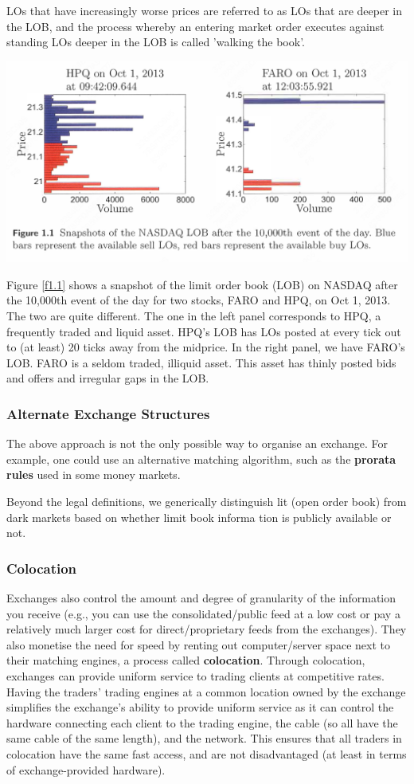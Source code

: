 \documentclass[11pt]{article}
\begin{document}
LOs that have increasingly worse prices are referred to as LOs that are deeper in the LOB, and the
process whereby an entering market order executes against standing LOs deeper in the LOB is called
'walking the book'.

\begin{center}
\includegraphics[width=.8\textwidth]{../images/Misc/15.png}
\label{f1.1}
\end{center}

Figure \ref{f1.1} shows a snapshot of the limit order book (LOB) on NASDAQ after the 10,000th event
of the day for two stocks, FARO and HPQ, on Oct 1, 2013. The two are quite different. The one in
the left panel corresponds to HPQ, a frequently traded and liquid asset. HPQ's LOB has LOs posted
at every tick out to (at least) 20 ticks away from the midprice. In the right panel, we have FARO's
LOB. FARO is a seldom traded, illiquid asset. This asset has thinly posted bids and offers and
irregular gaps in the LOB.
\subsubsection{Alternate Exchange Structures}
\label{sec:org2d23c4c}
The above approach is not the only possible way to organise an exchange. For example, one could use an
alternative matching algorithm, such as the \textbf{prorata rules} used in some money markets.

Beyond the legal definitions, we generically distinguish lit (open order book) from dark markets based
on whether limit book informa­ tion is publicly available or not.
\subsubsection{Colocation}
\label{sec:org17a0e8b}
Exchanges also control the amount and degree of granularity of the information you receive (e.g., you
can use the consolidated/public feed at a low cost or pay a relatively much larger cost for
direct/proprietary feeds from the exchanges). They also monetise the need for speed by renting out
computer/server space next to their matching engines, a process called \textbf{colocation}. Through colocation,
exchanges can provide uniform service to trading clients at competitive rates. Having the traders'
trading engines at a common location owned by the exchange simplifies the exchange's ability to
provide uniform service as it can control the hardware connecting each client to the trading engine,
the cable (so all have the same cable of the same length), and the network. This ensures that all
traders in colocation have the same fast access, and are not disadvantaged (at least in terms of
exchange-provided hardware).
\end{document}
